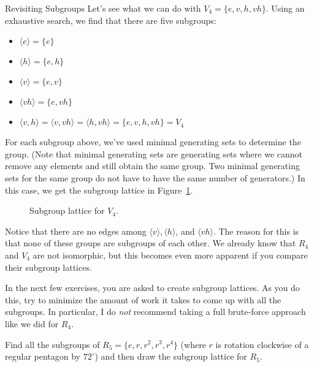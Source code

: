 \begin{section}{Revisiting Subgroups}
Let's see what we can do with $V_4=\{e,v,h,vh\}$.  Using an exhaustive search, we find that there are five subgroups:
\begin{itemize}
\item[] $\langle e \rangle = \{e\}$
\item[] $\langle h \rangle  = \{e,h\}$
\item[] $\langle v \rangle  = \{e,v\}$
\item[] $\langle vh \rangle  = \{e,vh\}$
\item[] $\langle v,h \rangle = \langle v,vh\rangle = \langle h, vh\rangle= \{e,v,h,vh\}=V_4$
\end{itemize}
For each subgroup above, we've used minimal generating sets to determine the group.  (Note that minimal generating sets are generating sets where we cannot remove any elements and still obtain the same group.  Two minimal generating sets for the same group do not have to have the same number of generators.)  In this case, we get the subgroup lattice in Figure~\ref{fig:latticeV4}.

\begin{figure}[!ht]
\centering
{}
\caption{Subgroup lattice for $V_4$.}
\label{fig:latticeV4}
\end{figure}

Notice that there are no edges among $\langle v\rangle, \langle h\rangle$, and $\langle vh\rangle$.  The reason for this is that none of these groups are subgroups of each other.  We already know that $R_4$ and $V_4$ are not isomorphic, but this becomes even more apparent if you compare their subgroup lattices.

In the next few exercises, you are asked to create subgroup lattices.  As you do this, try to minimize the amount of work it takes to come up with all the subgroups.  In particular, I do \emph{not} recommend taking a full brute-force approach like we did for $R_4$. 

\begin{exercise}
Find all the subgroups of $R_5=\{e,r,r^2,r^3,r^4\}$ (where $r$ is rotation clockwise of a regular pentagon by $72^{\circ}$) and then draw the subgroup lattice for $R_5$.
\end{exercise}


\end{section}
